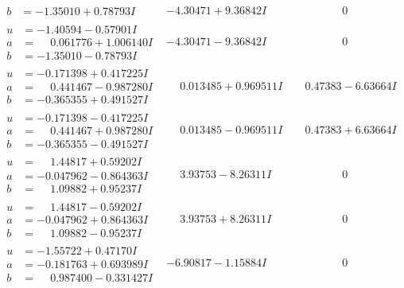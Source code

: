\documentclass[1p]{elsarticle_modified}
\theoremstyle{definition}
\begin{document}
$$\begin{array}{c|c|c}
\begin{aligned}
b &= -1.35010 + 0.78793 I\end{aligned}
 & -4.30471 + 9.36842 I & \phantom{-0.000000 } 0 \\ \hline\begin{aligned}
u &= -1.40594 - 0.57901 I \\
a &= \phantom{-}0.061776 + 1.006140 I \\
b &= -1.35010 - 0.78793 I\end{aligned}
 & -4.30471 - 9.36842 I & \phantom{-0.000000 } 0 \\ \hline\begin{aligned}
u &= -0.171398 + 0.417225 I \\
a &= \phantom{-}0.441467 - 0.987280 I \\
b &= -0.365355 + 0.491527 I\end{aligned}
 & \phantom{-}0.013485 + 0.969511 I & \phantom{-}0.47383 - 6.63664 I \\ \hline\begin{aligned}
u &= -0.171398 - 0.417225 I \\
a &= \phantom{-}0.441467 + 0.987280 I \\
b &= -0.365355 - 0.491527 I\end{aligned}
 & \phantom{-}0.013485 - 0.969511 I & \phantom{-}0.47383 + 6.63664 I \\ \hline\begin{aligned}
u &= \phantom{-}1.44817 + 0.59202 I \\
a &= -0.047962 - 0.864363 I \\
b &= \phantom{-}1.09882 + 0.95237 I\end{aligned}
 & \phantom{-}3.93753 - 8.26311 I & \phantom{-0.000000 } 0 \\ \hline\begin{aligned}
u &= \phantom{-}1.44817 - 0.59202 I \\
a &= -0.047962 + 0.864363 I \\
b &= \phantom{-}1.09882 - 0.95237 I\end{aligned}
 & \phantom{-}3.93753 + 8.26311 I & \phantom{-0.000000 } 0 \\ \hline\begin{aligned}
u &= -1.55722 + 0.47170 I \\
a &= -0.181763 + 0.693989 I \\
b &= \phantom{-}0.987400 - 0.331427 I\end{aligned}
 & -6.90817 - 1.15884 I & \phantom{-0.000000 } 0 \\ \hline\begin{aligned}

\end{aligned}
\end{array}$$
\end{document}
